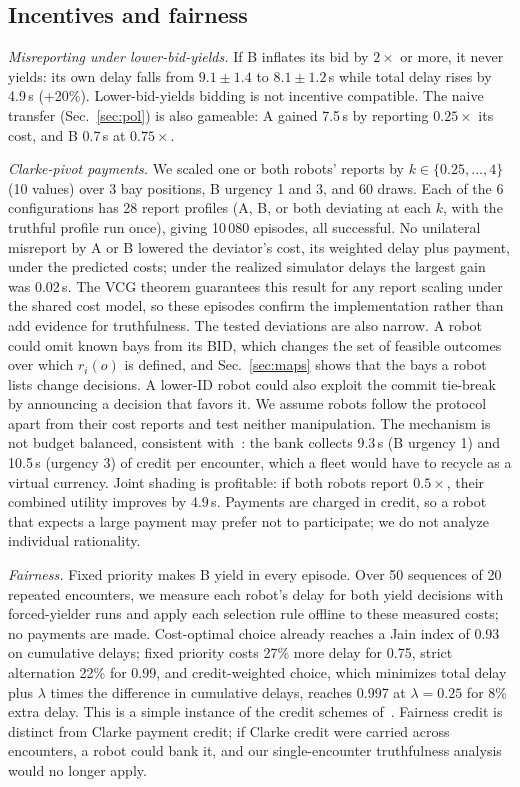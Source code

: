 \documentclass[letterpaper,journal]{IEEEtran}
\begin{document}
\subsection{Incentives and fairness}\label{sec:inc}
\emph{Misreporting under lower-bid-yields.} If B inflates its bid by $2\times$ or more, it never yields: its own delay falls from $9.1\pm1.4$ to $8.1\pm1.2$\,s while total delay rises by 4.9\,s (+20\%). Lower-bid-yields bidding is not incentive compatible. The naive transfer (Sec.~\ref{sec:pol}) is also gameable: A gained 7.5\,s by reporting $0.25\times$ its cost, and B 0.7\,s at $0.75\times$.

\emph{Clarke-pivot payments.} We scaled one or both robots' reports by $k\in\{0.25,\dots,4\}$ (10 values) over 3 bay positions, B urgency 1 and 3, and 60 draws. Each of the 6 configurations has 28 report profiles (A, B, or both deviating at each $k$, with the truthful profile run once), giving 10\,080 episodes, all successful. No unilateral misreport by A or B lowered the deviator's cost, its weighted delay plus payment, under the predicted costs; under the realized simulator delays the largest gain was 0.02\,s. The VCG theorem guarantees this result for any report scaling under the shared cost model, so these episodes confirm the implementation rather than add evidence for truthfulness. The tested deviations are also narrow. A robot could omit known bays from its BID, which changes the set of feasible outcomes over which $r_i(o)$ is defined, and Sec.~\ref{sec:maps} shows that the bays a robot lists change decisions. A lower-ID robot could also exploit the commit tie-break by announcing a decision that favors it. We assume robots follow the protocol apart from their cost reports and test neither manipulation. The mechanism is not budget balanced, consistent with~\cite{green1977characterization,myerson1983efficient}: the bank collects 9.3\,s (B urgency 1) and 10.5\,s (urgency 3) of credit per encounter, which a fleet would have to recycle as a virtual currency. Joint shading is profitable: if both robots report $0.5\times$, their combined utility improves by 4.9\,s. Payments are charged in credit, so a robot that expects a large payment may prefer not to participate; we do not analyze individual rationality.

\emph{Fairness.} Fixed priority makes B yield in every episode. Over 50 sequences of 20 repeated encounters, we measure each robot's delay for both yield decisions with forced-yielder runs and apply each selection rule offline to these measured costs; no payments are made. Cost-optimal choice already reaches a Jain index of 0.93 on cumulative delays; fixed priority costs 27\% more delay for 0.75, strict alternation 22\% for 0.99, and credit-weighted choice, which minimizes total delay plus $\lambda$ times the difference in cumulative delays, reaches 0.997 at $\lambda=0.25$ for 8\% extra delay. This is a simple instance of the credit schemes of~\cite{censi2019karma,elokda2024karma}. Fairness credit is distinct from Clarke payment credit; if Clarke credit were carried across encounters, a robot could bank it, and our single-encounter truthfulness analysis would no longer apply.
\end{document}

